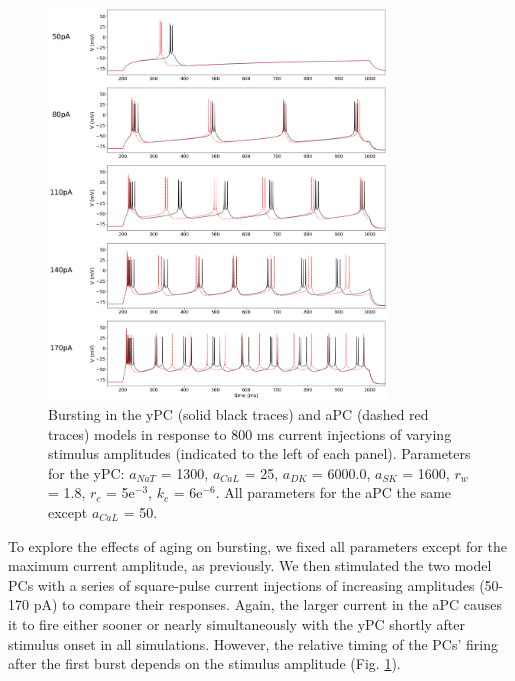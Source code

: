 \documentclass[12pt]{article}
\begin{document}
\begin{figure}[h!]
\centering
\includegraphics[width=0.8\textwidth]{figures/fig3.png}
\caption{Bursting in the yPC (solid black traces) and aPC (dashed red traces) models in response to 800 ms current injections of varying stimulus amplitudes (indicated to the left of each panel). Parameters for the yPC: $a_{NaT}$ = 1300, $a_{CaL}$ = 25, $a_{DK}$ = 6000.0, $a_{SK}$ = 1600, $r_{w}$ = 1.8, $r_{c}$ = 5e$^{-3}$, $k_{c}$ = 6e$^{-6}$. All parameters for the aPC the same except $a_{CaL}$ = 50.}
\label{fig:burstStims}
\end{figure}

To explore the effects of aging on bursting, we fixed all parameters except for the maximum {\Ca} current amplitude, as previously. We then stimulated the two model PCs with a series of square-pulse current injections of increasing amplitudes (50-170 pA) to compare their responses. Again, the larger {\Ca} current in the aPC causes it to fire either sooner or nearly simultaneously with the yPC shortly after stimulus onset in all simulations. However, the relative timing of the PCs' firing after the first burst depends on the stimulus amplitude (Fig. \ref{fig:burstStims}).
\end{document}
